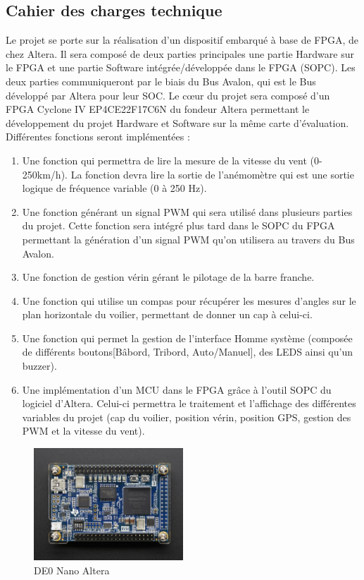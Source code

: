 \subsection{Cahier des charges technique}
Le projet se porte sur la réalisation d'un dispositif embarqué à base de FPGA, de chez Altera. Il sera composé de deux parties principales une partie Hardware sur le FPGA et une partie Software intégrée/développée dans le FPGA (SOPC). Les deux parties communiqueront par le biais du Bus Avalon, qui est le Bus développé par Altera pour leur SOC.
Le cœur du projet sera composé d'un FPGA Cyclone IV EP4CE22F17C6N du fondeur Altera permettant le développement du projet Hardware et Software sur la même carte d'évaluation. Différentes fonctions seront implémentées :
\vspace{0.75cm}
\begin{enumerate}
    \item Une fonction qui permettra de lire la mesure de la vitesse du vent (0-250km/h). La fonction devra lire la sortie de l'anémomètre qui est une sortie logique de fréquence variable (0 à 250 Hz). 
    \item Une fonction générant un signal PWM qui sera utilisé dans plusieurs parties du projet. Cette fonction sera intégré plus tard dans le SOPC du FPGA permettant la génération d'un signal PWM qu'on utilisera au travers du Bus Avalon.
    \item Une fonction de gestion vérin gérant le pilotage de la barre franche.
    \item Une fonction qui utilise un compas pour récupérer les mesures d'angles sur le plan horizontale du voilier, permettant de donner un cap à celui-ci.
    \item Une fonction qui permet la gestion de l'interface Homme système (composée de différents boutons[Bâbord, Tribord, Auto/Manuel], des LEDS ainsi qu'un buzzer).
    \item Une implémentation d'un MCU dans le FPGA grâce à l'outil SOPC du logiciel d'Altera. Celui-ci permettra le traitement et l'affichage des différentes variables du projet (cap du voilier, position vérin, position GPS, gestion des PWM et la vitesse du vent).
\end{enumerate}

\begin{figure}[h]
  \begin{center}
    \includegraphics[width=0.5\textwidth]{images/DE0.jpg}
    \caption{DE0 Nano Altera}
  \end{center}
\end{figure}